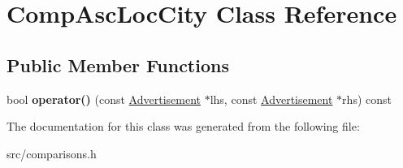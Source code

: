 \hypertarget{class_comp_asc_loc_city}{}\section{Comp\+Asc\+Loc\+City Class Reference}
\label{class_comp_asc_loc_city}
\subsection*{Public Member Functions}
\begin{DoxyCompactItemize}
\item 
\hypertarget{class_comp_asc_loc_city_ab76a91bbc2e73c14bf453a000c990d9c}{}bool {\bfseries operator()} (const \hyperlink{class_advertisement}{Advertisement} $\ast$lhs, const \hyperlink{class_advertisement}{Advertisement} $\ast$rhs) const \label{class_comp_asc_loc_city_ab76a91bbc2e73c14bf453a000c990d9c}

\end{DoxyCompactItemize}


The documentation for this class was generated from the following file\+:\begin{DoxyCompactItemize}
\item 
src/comparisons.\+h\end{DoxyCompactItemize}

